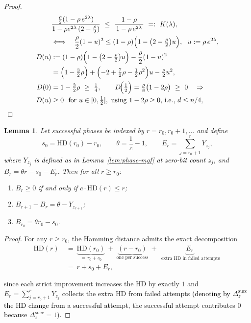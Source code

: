\documentclass[lettersize,journal]{IEEEtran}
\newcommand{\rerev}[1]{\textcolor{black}{#1}}
\newcommand{\HD}{\text{HD}}
\newtheorem{lemma}{Lemma}
\begin{document}
{\begin{proof}
\begin{align*}
		&\frac{\tfrac{\rho}{2}(1-\rho\,e^{2\lambda})}{1-\rho e^{2\lambda}\,(2-\tfrac{\rho}{2})}
		\  \le\ \frac{1-\rho}{\,1-\rho\,e^{2\lambda}\,}
		\ =:\ K(\lambda),
		\\&\Longleftrightarrow\quad
		\frac{\rho}{2}(1-u)^2 \le (1-\rho)\Bigl(1-\bigl(2-\tfrac{\rho}{2}\bigr)u\Bigr),\ \ u:=\rho\,e^{2\lambda},
		\\
		D(u)
		&:=(1-\rho)\Bigl(1-\bigl(2-\tfrac{\rho}{2}\bigr)u\Bigr)-\frac{\rho}{2}(1-u)^2
		\\&= \Bigl(1-\tfrac{3}{2}\rho\Bigr)+\Bigl(-2+\tfrac{7}{2}\rho-\tfrac{1}{2}\rho^2\Bigr)u-\tfrac{\rho}{2}u^2,
		\\
		D(0)&=1-\tfrac{3}{2}\rho\ \ge\ \tfrac14,\qquad
		D\!\Big(\tfrac12\Big)=\tfrac{\rho}{8}\bigl(1-2\rho\bigr)\ \ge\ 0
		\quad\Rightarrow\quad \\
		D(u)&\ge 0\ \text{ for }u\in[0,\tfrac12]\rerev{,\text{ using }1-2\rho\ge 0\text{, i.e., }d\le n/4},
	\end{align*}
	
	
\end{proof}


\setcounter{theorem}{6}
\begin{lemma}%
	Let successful phases be indexed by $r=r_0,r_0+1,\dots$ and define
	\[
	s_0=\mathrm{HD}(r_0)-r_0, \qquad 
	\theta=\frac{1}{c}-1, \qquad
	E_r=\sum_{j=r_0+1}^{r} Y_{z_j},
	\]
\rerev{where $Y_{z_j}$ is defined as in Lemma~\ref{lem:phase-mgf} at zero-bit count $z_j$,}	and $B_r = \theta r - s_0 - E_r$.
	Then for all $r\ge r_0$:
	\begin{enumerate}
		\item 
		$B_r\ge0$ if and only if $c\cdot\mathrm{HD}(r)\le r$;
		\item 
		$B_{r+1}-B_r=\theta-Y_{z_{r+1}}$;
		\item 
		$B_{r_0}=\theta r_0 - s_0$.
	\end{enumerate}
\end{lemma}

\begin{proof}
	For any $r\ge r_0$, the Hamming distance admits the exact decomposition
	\begin{align*}
		\HD(r)\ &=\ \underbrace{\HD(r_0)}_{=\,r_0+s_0}\ +\ \underbrace{(r-r_0)}_{\text{one per success}}\ +\ \underbrace{E_r}_{\text{ extra HD in failed attempts}}
		\ \\&=\ r+s_0+E_r,		
	\end{align*}
	
	since each strict improvement increases the HD by exactly $1$ and $E_r=\sum_{j=r_0+1}^r Y_{z_j}$ collects the extra HD from failed attempts (\rerev{denoting by $\Delta_z^{\mathrm{succ}}$ the HD change from a successful attempt,} the successful attempt contributes $0$ because $\Delta_z^{\mathrm{succ}}=1$).
	

\end{proof}}
\end{document}
